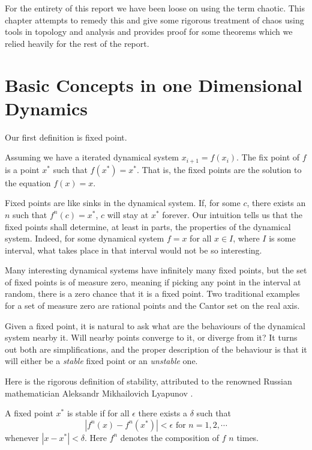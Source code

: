 For the entirety of this report we have been loose on using the term chaotic.
This chapter attempts to remedy this and give some rigorous treatment of chaos using tools in topology and analysis and provides proof for some theorems which we relied heavily for the rest of the report.

\section{Basic Concepts in one Dimensional Dynamics}

Our first definition is fixed point.

\begin{defn}
	Assuming we have a iterated dynamical system $x_{i+1} = f(x_i)$. 
	The fix point of $f$ is a point $x^*$ such that $f(x^*) = x^*$. 
	That is, the fixed points are the solution to the equation $f(x) = x$.
\end{defn}

Fixed points are like sinks in the dynamical system. 
If, for some $c$, there exists an $n$ such that $f^n(c) = x^*$, $c$ will stay at $x^*$ forever. 
Our intuition tells us that the fixed points shall determine, at least in parts, the properties of the dynamical system.
Indeed, for some dynamical system $f = x$ for all $x \in I$, where $I$ is some interval, what takes place in that interval would not be so interesting.

Many interesting dynamical systems have infinitely many fixed points, but the set of fixed points is of measure zero, meaning if picking any point in the interval at random, there is a zero chance that it is a fixed point.
Two traditional examples for a set of measure zero are rational points and the Cantor set on the real axis. 

Given a fixed point, it is natural to ask what are the behaviours of the dynamical system nearby it.
Will nearby points converge to it, or diverge from it?
It turns out both are simplifications, and the proper description of the behaviour is that it will either be a \emph{stable} fixed point or an \emph{unstable} one. 

Here is the rigorous definition of stability, attributed to the renowned Russian mathematician Aleksandr Mikhailovich Lyapunov \cite{lyapunov}.

\begin{defn}
A fixed point $x^*$ is stable if for all $\epsilon$ there exists a $\delta$ such that 
$$
	|f^n(x) - f^n(x^*)| < \epsilon \text{ for } n = 1,2, \cdots 
$$
whenever $|x - x^*| < \delta$.
Here $f^n$ denotes the composition of $f$ $n$ times.
\end{defn}

